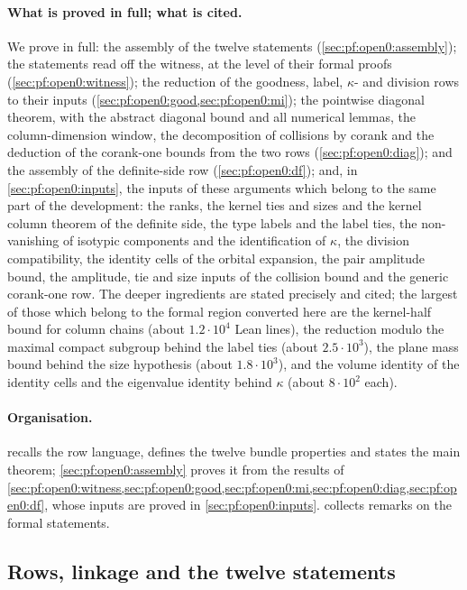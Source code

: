 \paragraph{What is proved in full; what is cited.}
We prove in full: the assembly of the twelve statements (\cref{sec:pf:open0:assembly}); the statements read off the
witness, at the level of their formal proofs (\cref{sec:pf:open0:witness}); the reduction of the goodness, label,
$\kappa$- and division rows to their inputs (\cref{sec:pf:open0:good,sec:pf:open0:mi}); the pointwise diagonal theorem,
with the abstract diagonal bound and all numerical lemmas, the column-dimension window, the decomposition of collisions
by corank and the deduction of the corank-one bounds from the two rows (\cref{sec:pf:open0:diag}); and the assembly of
the definite-side row (\cref{sec:pf:open0:df}); and, in \cref{sec:pf:open0:inputs}, the inputs of these arguments which belong
to the same part of the development: the ranks, the kernel ties and sizes and the kernel column theorem of the definite side, the type
labels and the label ties, the non-vanishing of isotypic components and the identification of $\kappa$, the division compatibility,
the identity cells of the orbital expansion, the pair amplitude bound, the amplitude, tie and size inputs of the collision bound and
the generic corank-one row. The deeper ingredients are stated precisely and cited; the largest of those which belong to the formal
region converted here are the kernel-half bound for column chains (about $1.2\cdot10^4$ Lean lines), the reduction modulo the maximal
compact subgroup behind the label ties (about $2.5\cdot10^3$), the plane mass bound behind the size hypothesis (about $1.8\cdot10^3$),
and the volume identity of the identity cells and the eigenvalue identity behind $\kappa$ (about $8\cdot10^2$ each).

\paragraph{Organisation.}
 recalls the row language, defines the twelve bundle properties and states the main
theorem; \cref{sec:pf:open0:assembly} proves it from the results of
\cref{sec:pf:open0:witness,sec:pf:open0:good,sec:pf:open0:mi,sec:pf:open0:diag,sec:pf:open0:df}, whose inputs are proved in
\cref{sec:pf:open0:inputs}.  collects remarks on the formal statements.

\subsection{Rows, linkage and the twelve statements}\label{sec:pf:open0:setting}

